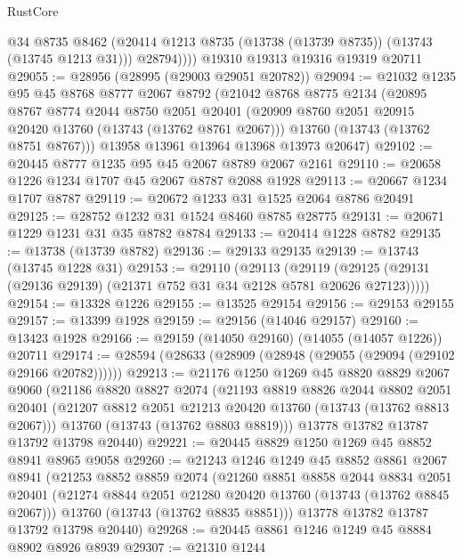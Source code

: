 \begin{lexlean}{RustCore}
\begin{coremodule}
            @34
            @8735
            @8462
            (@20414 @1213 @8735 (@13738 (@13739 @8735)) (@13743 (@13745 @1213 @31)))
            @28794))))
    @19310
    @19313
    @19316
    @19319
    @20711
@29055 := @28956 (@28995 (@29003 @29051 @20782))
@29094 := @21032
    @1235
    @95
    @45
    @8768
    @8777
    @2067
    @8792
    (@21042
      @8768
      @8775
      @2134
      (@20895
        @8767
        @8774
        @2044
        @8750
        @2051
        @20401
        (@20909 @8760 @2051 @20915 @20420 @13760 (@13743 (@13762 @8761 @2067)))
        @13760
        (@13743 (@13762 @8751 @8767)))
      @13958
      @13961
      @13964
      @13968
      @13973
      @20647)
@29102 := @20445 @8777 @1235 @95 @45 @2067 @8789 @2067 @2161
@29110 := @20658 @1226 @1234 @1707 @45 @2067 @8787 @2088 @1928
@29113 := @20667 @1234 @1707 @8787
@29119 := @20672 @1233 @31 @1525 @2064 @8786 @20491
@29125 := @28752 @1232 @31 @1524 @8460 @8785 @28775
@29131 := @20671 @1229 @1231 @31 @35 @8782 @8784
@29133 := @20414 @1228 @8782
@29135 := @13738 (@13739 @8782)
@29136 := @29133 @29135
@29139 := @13743 (@13745 @1228 @31)
@29153 := @29110
    (@29113
      (@29119 (@29125 (@29131 (@29136 @29139) (@21371 @752 @31 @34 @2128 @5781 @20626 @27123)))))
@29154 := @13328 @1226
@29155 := @13525 @29154
@29156 := @29153 @29155
@29157 := @13399 @1928
@29159 := @29156 (@14046 @29157)
@29160 := @13423 @1928
@29166 := @29159 (@14050 @29160) (@14055 (@14057 @1226)) @20711
@29174 := @28594 (@28633 (@28909 (@28948 (@29055 (@29094 (@29102 @29166 @20782))))))
@29213 := @21176
    @1250
    @1269
    @45
    @8820
    @8829
    @2067
    @9060
    (@21186
      @8820
      @8827
      @2074
      (@21193
        @8819
        @8826
        @2044
        @8802
        @2051
        @20401
        (@21207 @8812 @2051 @21213 @20420 @13760 (@13743 (@13762 @8813 @2067)))
        @13760
        (@13743 (@13762 @8803 @8819)))
      @13778
      @13782
      @13787
      @13792
      @13798
      @20440)
@29221 := @20445 @8829 @1250 @1269 @45 @8852 @8941 @8965 @9058
@29260 := @21243
    @1246
    @1249
    @45
    @8852
    @8861
    @2067
    @8941
    (@21253
      @8852
      @8859
      @2074
      (@21260
        @8851
        @8858
        @2044
        @8834
        @2051
        @20401
        (@21274 @8844 @2051 @21280 @20420 @13760 (@13743 (@13762 @8845 @2067)))
        @13760
        (@13743 (@13762 @8835 @8851)))
      @13778
      @13782
      @13787
      @13792
      @13798
      @20440)
@29268 := @20445 @8861 @1246 @1249 @45 @8884 @8902 @8926 @8939
@29307 := @21310
    @1244

\end{coremodule}
\end{lexlean}
